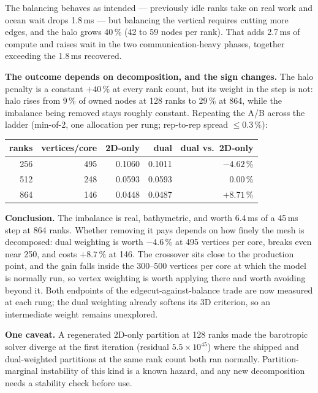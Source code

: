 \documentclass[10pt,a4paper]{article}
\begin{document}
\noindent
The balancing behaves as intended --- previously idle ranks take on real work and ocean wait
drops 1.8\,ms --- but balancing the vertical requires cutting more edges, and the halo grows
40\,\% (42 to 59 nodes per rank). That adds 2.7\,ms of compute and raises wait in the two
communication-heavy phases, together exceeding the 1.8\,ms recovered.

\textbf{The outcome depends on decomposition, and the sign changes.} The halo penalty is a
constant $+40\,\%$ at every rank count, but its weight in the step is not: halo rises from
9\,\% of owned nodes at 128 ranks to 29\,\% at 864, while the imbalance being removed stays
roughly constant. Repeating the A/B across the ladder (min-of-2, one allocation per rung;
rep-to-rep spread $\le0.3\,\%$):

\begin{center}\vspace{-4pt}\footnotesize
\begin{tabular}{rrrrr}
\toprule
ranks & vertices/core & 2D-only & dual & dual vs.\ 2D-only \\
\midrule
256 & 495 & 0.1060 & 0.1011 & $\mathbf{-4.62}$\,\% \\
512 & 248 & 0.0593 & 0.0593 & $0.00$\,\% \\
864 & 146 & 0.0448 & 0.0487 & $+8.71$\,\% \\
\bottomrule
\end{tabular}\vspace{-4pt}
\end{center}

\textbf{Conclusion.} The imbalance is real, bathymetric, and worth 6.4\,ms of a 45\,ms step at
864 ranks. Whether removing it pays depends on how finely the mesh is decomposed: dual
weighting is worth $-4.6\,\%$ at 495 vertices per core, breaks even near 250, and costs
$+8.7\,\%$ at 146. The crossover sits close to the production point, and the gain falls inside
the 300--500 vertices per core at which the model is normally run, so vertex weighting is
worth applying there and worth avoiding beyond it. Both endpoints of the
edgecut-against-balance trade are now measured at each rung; the dual weighting already
softens its 3D criterion, so an intermediate weight remains unexplored.

\textbf{One caveat.} A regenerated 2D-only partition at 128 ranks made the barotropic solver
diverge at the first iteration (residual $5.5\times10^{45}$) where the shipped and
dual-weighted partitions at the same rank count both ran normally. Partition-marginal
instability of this kind is a known hazard, and any new decomposition needs a stability check
before use.
\end{document}
